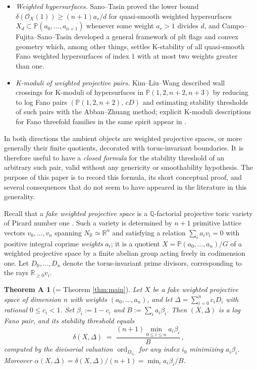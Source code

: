 \documentclass[11pt]{amsart}
\newtheorem*{theoremA}{Theorem A}
\theoremstyle{definition}
\theoremstyle{remark}
\DeclareMathOperator{\ord}{ord}
\newcommand{\NR}{N_{\mathbb{R}}}
\newcommand{\Q}{\mathbb{Q}}
\newcommand{\R}{\mathbb{R}}
\newcommand{\PP}{\mathbb{P}}
\begin{document}
\begin{itemize}[leftmargin=2em]
\item \emph{Weighted hypersurfaces.} Sano--Tasin \cite{ST24} proved the
lower bound \(\delta(\mathcal O_X(1)) \ge (n+1)a_r/d\) for quasi-smooth
weighted hypersurfaces \(X_d\subset\PP(a_0,\dots,a_{n+1})\) whenever some
weight \(a_r>1\) divides \(d\), and Campo--Fujita--Sano--Tasin
\cite{CFST26} developed a general framework of plt flags and convex
geometry which, among other things, settles K-stability of all quasi-smooth
Fano weighted hypersurfaces of index \(1\) with at most two weights greater
than one.
\item \emph{K-moduli of weighted projective pairs.} Kim--Liu--Wang
\cite{KLW24} described wall crossings for K-moduli of hypersurfaces in
\(\PP(1,2,n+2,n+3)\) by reducing to log Fano pairs
\((\PP(1,2,n+2),\,cD)\) and estimating stability thresholds of such pairs
with the Abban--Zhuang method; explicit K-moduli descriptions for Fano
threefold families in the same spirit appear in \cite{EJP25,LZ24}.
\end{itemize}

In both directions the ambient objects are weighted projective spaces, or
more generally their finite quotients, decorated with torus-invariant
boundaries. It is therefore useful to have a \emph{closed formula} for the
stability threshold of an arbitrary such pair, valid without any genericity
or smoothability hypothesis. The purpose of this paper is to record this
formula, its short conceptual proof, and several consequences that do not
seem to have appeared in the literature in this generality.

Recall that a \emph{fake weighted projective space} is a \(\Q\)-factorial
projective toric variety of Picard number one \cite{Buc08,Kas09}. Such a
variety is determined by \(n+1\) primitive lattice vectors
\(v_0,\dots,v_n\) spanning \(\NR\simeq\R^n\) and satisfying a relation
\(\sum_i a_i v_i = 0\) with positive integral coprime \emph{weights}
\(a_i\); it is a quotient \(X = \PP(a_0,\dots,a_n)/G\) of a weighted
projective space by a finite abelian group acting freely in codimension
one. Let \(D_0,\dots,D_n\) denote the torus-invariant prime divisors,
corresponding to the rays \(\R_{\ge0}v_i\).

\begin{theoremA}[= Theorem \ref{thm:main}]
Let \(X\) be a fake weighted projective space of dimension \(n\) with
weights \((a_0,\dots,a_n)\), and let
\(\Delta=\sum_{i=0}^{n} c_i D_i\) with rational \(0\le c_i<1\). Set
\(\beta_i := 1-c_i\) and \(B:=\sum_{i} a_i\beta_i\). Then \((X,\Delta)\) is
a log Fano pair, and its stability threshold equals
\[
\delta(X,\Delta)\;=\;\frac{(n+1)\min_{0\le i\le n} a_i\beta_i}{B}\,,
\]
computed by the divisorial valuation \(\ord_{D_{i_0}}\) for any index
\(i_0\) minimizing \(a_i\beta_i\). Moreover
\(\alpha(X,\Delta) = \delta(X,\Delta)/(n+1) = \min_i a_i \beta_i / B\).
\end{theoremA}
\end{document}
